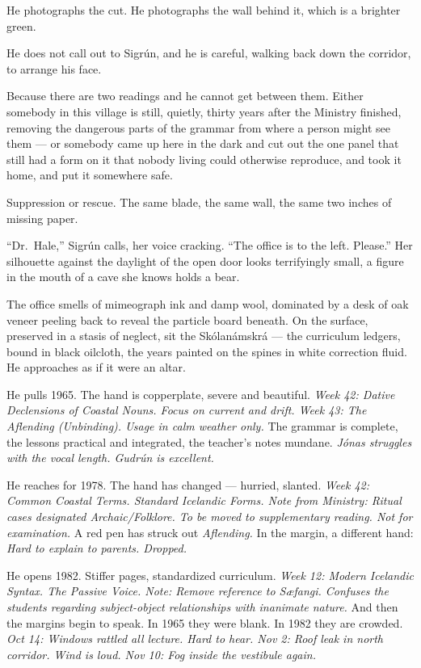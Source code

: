 \documentclass[11pt,oneside]{book}
\newcommand{\sceneline}{%
  \par\vspace{1.2em}
  \begin{center}
    \fontsize{11}{11}\selectfont \textbullet\quad\textbullet\quad\textbullet
  \end{center}
  \vspace{0.6em}\noindent\ignorespaces
}
\begin{document}
He photographs the cut. He photographs the wall behind it, which is a
brighter green.

He does not call out to Sigrún, and he is careful, walking back down the
corridor, to arrange his face.

Because there are two readings and he cannot get between them. Either
somebody in this village is still, quietly, thirty years after the
Ministry finished, removing the dangerous parts of the grammar from
where a person might see them --- or somebody came up here in the dark
and cut out the one panel that still had a form on it that nobody living
could otherwise reproduce, and took it home, and put it somewhere safe.

Suppression or rescue. The same blade, the same wall, the same two
inches of missing paper.

``Dr.~Hale,'' Sigrún calls, her voice cracking. ``The office is to the
left. Please.'' Her silhouette against the daylight of the open door
looks terrifyingly small, a figure in the mouth of a cave she knows
holds a bear.

\sceneline

The office smells of mimeograph ink and damp wool, dominated by a desk
of oak veneer peeling back to reveal the particle board beneath. On the
surface, preserved in a stasis of neglect, sit the Skólanámskrá --- the
curriculum ledgers, bound in black oilcloth, the years painted on the
spines in white correction fluid. He approaches as if it were an altar.

He pulls 1965. The hand is copperplate, severe and beautiful. \emph{Week
42: Dative Declensions of Coastal Nouns. Focus on current and drift.
Week 43: The Aflending (Unbinding). Usage in calm weather only.} The
grammar is complete, the lessons practical and integrated, the teacher's
notes mundane. \emph{Jónas struggles with the vocal length. Gudrún is
excellent.}

He reaches for 1978. The hand has changed --- hurried, slanted.
\emph{Week 42: Common Coastal Terms. Standard Icelandic Forms. Note from
Ministry: Ritual cases designated Archaic/Folklore. To be moved to
supplementary reading. Not for examination.} A red pen has struck out
\emph{Aflending.} In the margin, a different hand: \emph{Hard to explain
to parents. Dropped.}

He opens 1982. Stiffer pages, standardized curriculum. \emph{Week 12:
Modern Icelandic Syntax. The Passive Voice. Note: Remove reference to
Sæfangi. Confuses the students regarding subject-object relationships
with inanimate nature.} And then the margins begin to speak. In 1965
they were blank. In 1982 they are crowded. \emph{Oct 14: Windows rattled
all lecture. Hard to hear. Nov 2: Roof leak in north corridor. Wind is
loud. Nov 10: Fog inside the vestibule again.}
\end{document}
